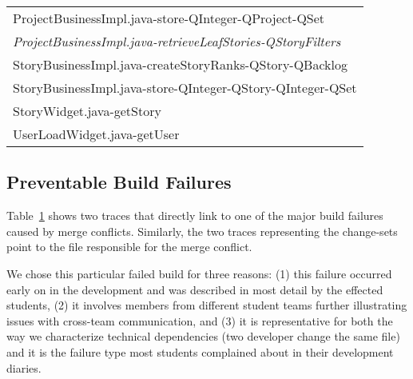 \begin{table}[t!]
\begin{tabular}{@{\hspace{2pt}}l@{\hspace{2pt}}}
     ProjectBusinessImpl.java-store-QInteger-QProject-QSet        \\%
     \emph{ProjectBusinessImpl.java-retrieveLeafStories-QStoryFilters}                                 \\%
     StoryBusinessImpl.java-createStoryRanks-QStory-QBacklog                     \\%
     StoryBusinessImpl.java-store-QInteger-QStory-QInteger-QSet  \\%
     StoryWidget.java-getStory                                                       \\%
     UserLoadWidget.java-getUser                                                     \\%
      \bottomrule
\end{tabular}
\label{tab:overlappingtraces}
\end{table}

\subsection{Preventable Build Failures}
Table~\ref{tab:overlappingtraces} shows two traces that directly link to one of the major build failures caused by merge conflicts.
Similarly, the two traces representing the change-sets point to the file responsible for the merge conflict.

We chose this particular failed build for three reasons:
(1) this failure occurred early on in the development and was described in most detail by the effected students,
(2) it involves members from different student teams further illustrating issues with cross-team communication,
and (3) it is representative for both the way we characterize technical dependencies (two developer change the same file) and it is the failure type most students complained about in their development diaries.

